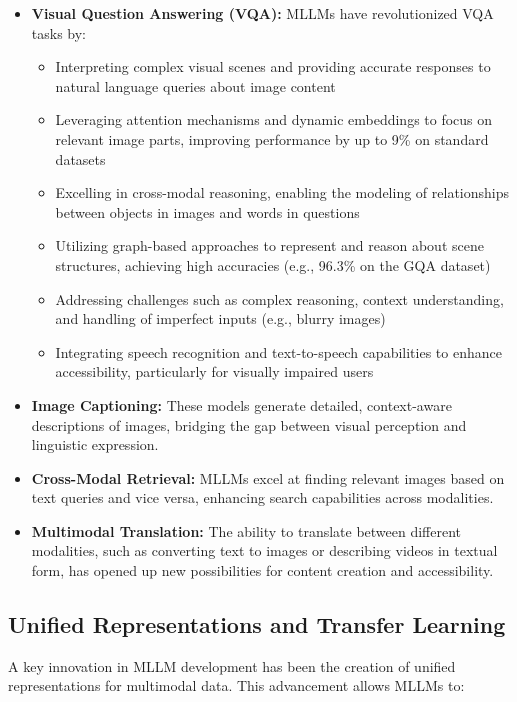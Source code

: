\begin{itemize}
    \item \textbf{Visual Question Answering (VQA):} MLLMs have revolutionized VQA tasks by:
        \begin{itemize}
            \item Interpreting complex visual scenes and providing accurate responses to natural language queries about image content
            \item Leveraging attention mechanisms and dynamic embeddings to focus on relevant image parts, improving performance by up to 9\% on standard datasets
            \item Excelling in cross-modal reasoning, enabling the modeling of relationships between objects in images and words in questions
            \item Utilizing graph-based approaches to represent and reason about scene structures, achieving high accuracies (e.g., 96.3\% on the GQA dataset)
            \item Addressing challenges such as complex reasoning, context understanding, and handling of imperfect inputs (e.g., blurry images)
            \item Integrating speech recognition and text-to-speech capabilities to enhance accessibility, particularly for visually impaired users
        \end{itemize}
    \item \textbf{Image Captioning:} These models generate detailed, context-aware descriptions of images, bridging the gap between visual perception and linguistic expression.
    \item \textbf{Cross-Modal Retrieval:} MLLMs excel at finding relevant images based on text queries and vice versa, enhancing search capabilities across modalities.
    \item \textbf{Multimodal Translation:} The ability to translate between different modalities, such as converting text to images or describing videos in textual form, has opened up new possibilities for content creation and accessibility.
\end{itemize}

\subsection{Unified Representations and Transfer Learning}

A key innovation in MLLM development has been the creation of unified representations for multimodal data. This advancement allows MLLMs to:

